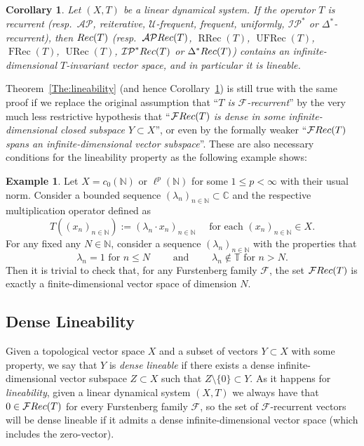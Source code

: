 \documentclass[openright,11pt]{article}
\theoremstyle{plain}
\newtheorem{corollary}[theorem]{Corollary}
\theoremstyle{definition}
\newtheorem{example}[theorem]{Example}
\newcommand{\NN}{\mathbb{N}}
\newcommand{\CC}{\mathbb{C}}
\newcommand{\TT}{\mathbb{T}}
\newcommand{\AP}{\mathcal{AP}}
\newcommand{\Del}{\Delta}
\newcommand{\Fc}{\mathcal{F}}
\newcommand{\IP}{\mathcal{IP}}
\newcommand{\Uc}{\mathcal{U}}
\newcommand{\URec}{\operatorname{URec}}
\newcommand{\FRec}{\operatorname{FRec}}
\newcommand{\UFRec}{\operatorname{UFRec}}
\newcommand{\RRec}{\operatorname{RRec}}
\newcommand{\Rec}{\textup{Rec}}
\begin{document}
\begin{corollary}\label{Cor:lineability}
	Let $(X,T)$ be a linear dynamical system. If the operator $T$ is recurrent (resp.\ $\AP$, reiterative, $\Uc$-frequent, frequent, uniformly, $\IP^*$ or $\Del^*$-recurrent), then $\Rec(T)$ (resp.\ $\AP\Rec(T)$, $\RRec(T)$, $\UFRec(T)$, $\FRec(T)$, $\URec(T)$, $\IP^*\Rec(T)$ or $\Del^*\Rec(T)$) contains an infinite-dimensional $T$-invariant vector space, and in particular it is lineable.
\end{corollary}

Theorem~\ref{The:lineability} (and hence Corollary~\ref{Cor:lineability}) is still true with the same proof if we replace the original assumption that ``{\em $T$ is $\Fc$-recurrent}'' by the very much less restrictive hypothesis that ``{\em $\Fc\Rec(T)$ is dense in some infinite-dimensional closed subspace $Y \subset X$}'', or even by the formally weaker ``{\em $\Fc\Rec(T)$ spans an infinite-dimensional vector subspace}''. These are also necessary conditions for the lineability property as the following example shows:

\begin{example}
	Let $X=c_0(\NN)$ or $\ell^p(\NN)$ for some $1\leq p<\infty$ with their usual norm. Consider a bounded sequence $(\lambda_n)_{n\in\NN} \subset \CC$ and the respective multiplication operator defined as
	\[
	T\left( (x_n)_{n\in\NN} \right) := (\lambda_n \cdot x_n)_{n\in\NN} \quad \text{ for each } (x_n)_{n\in\NN} \in X. 
	\]
	For any fixed any $N \in \NN$, consider a sequence $(\lambda_n)_{n\in\NN}$ with the properties that
	\[
	\lambda_n=1 \text{ for } n\leq N \qquad \text{ and } \qquad \lambda_n \notin \TT \text{ for } n>N.
	\]
	Then it is trivial to check that, for any Furstenberg family $\Fc$, the set $\Fc\Rec(T)$ is exactly a finite-dimensional vector space of dimension $N$.
\end{example}

\subsection{Dense Lineability}

Given a topological vector space $X$ and a subset of vectors $Y \subset X$ with some property, we say that $Y$ is {\em dense lineable} if there exists a dense infinite-dimensional vector subspace $Z \subset X$ such that $Z\setminus\{0\} \subset Y$. As it happens for {\em lineability}, given a linear dynamical system $(X,T)$ we always have that $0 \in \Fc\Rec(T)$ for every Furstenberg family $\Fc$, so the set of $\Fc$-recurrent vectors will be dense lineable if it admits a dense infinite-dimensional vector space (which includes the zero-vector).\\[-5pt]
\end{document}
